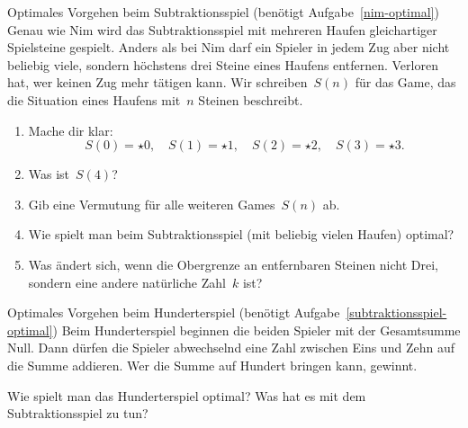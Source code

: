 \documentclass{zirkelblatt}
\begin{document}
\begin{aufgabe}{Optimales Vorgehen beim Subtraktionsspiel
(benötigt Aufgabe~\ref{nim-optimal})}
\label{subtraktionsspiel-optimal}
Genau wie Nim wird das Subtraktionsspiel mit mehreren Haufen gleichartiger
Spielsteine gespielt. Anders als bei Nim darf ein Spieler in jedem Zug aber
nicht beliebig viele, sondern höchstens drei Steine eines Haufens
entfernen. Verloren hat, wer keinen Zug mehr tätigen kann.
Wir schreiben~$S(n)$ für das Game, das die Situation eines Haufens mit~$n$
Steinen beschreibt.
\begin{enumerate}
\item Mache dir klar:
\[ S(0) = \star0, \quad S(1) = \star1, \quad S(2) = \star2, \quad
  S(3) = \star3. \]
\item Was ist~$S(4)$?
\item Gib eine Vermutung für alle weiteren Games~$S(n)$ ab.
\item Wie spielt man beim Subtraktionsspiel (mit beliebig vielen Haufen)
optimal?
\item Was ändert sich, wenn die Obergrenze an entfernbaren Steinen nicht Drei,
sondern eine andere natürliche Zahl~$k$ ist?
\end{enumerate}
\end{aufgabe}

\begin{aufgabe}{Optimales Vorgehen beim Hunderterspiel
(benötigt Aufgabe~\ref{subtraktionsspiel-optimal})}
Beim Hunderterspiel beginnen die beiden Spieler mit der Gesamtsumme Null. Dann
dürfen die Spieler abwechselnd eine Zahl zwischen Eins und Zehn auf die Summe
addieren. Wer die Summe auf Hundert bringen kann, gewinnt.

Wie spielt man das Hunderterspiel optimal? Was hat es mit dem Subtraktionsspiel
zu tun?
\end{aufgabe}
\end{document}
